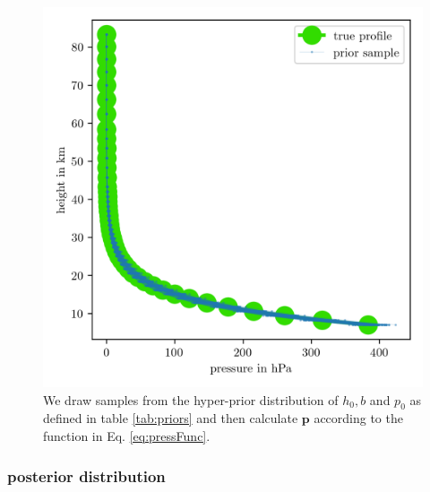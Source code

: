 \begin{figure}[ht!]
	\centering
	\includegraphics{PriorPressPostMeanSigm.png}
	\caption[Prior Samples of $\bm{p}$ according to the respective hyper-prior distribution.]{We draw samples from the hyper-prior distribution of $h_0, b$ and $p_0$ as defined in table \ref{tab:priors} and then calculate $\bm{p}$ according to the function in Eq. \ref{eq:pressFunc}.}
	\label{fig:PriorPress}
\end{figure}

\subsubsection{posterior distribution}

\clearpage
